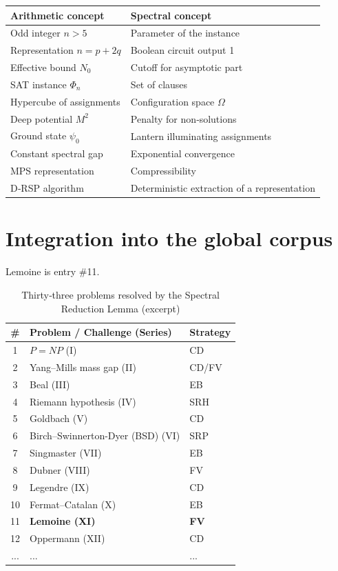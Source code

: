 \documentclass[11pt,a4paper]{article}
\begin{document}
\begin{center}
\small
\begin{tabular}{@{}l|l@{}}
\toprule
\textbf{Arithmetic concept} & \textbf{Spectral concept} \\
\midrule
Odd integer $n > 5$ & Parameter of the instance \\
Representation $n = p + 2q$ & Boolean circuit output 1 \\
Effective bound $N_0$ & Cutoff for asymptotic part \\
SAT instance $\Phi_n$ & Set of clauses \\
Hypercube of assignments & Configuration space $\Omega$ \\
Deep potential $M^2$ & Penalty for non‑solutions \\
Ground state $\psi_0$ & Lantern illuminating assignments \\
Constant spectral gap & Exponential convergence \\
MPS representation & Compressibility \\
D‑RSP algorithm & Deterministic extraction of a representation \\
\bottomrule
\end{tabular}
\end{center}

\section{Integration into the global corpus}

Lemoine is entry \#11.

\begin{center}
\small
\begin{longtable}{@{}cll@{}}
\caption{Thirty‑three problems resolved by the Spectral Reduction Lemma (excerpt)}\\
\toprule
\# & Problem / Challenge (Series) & Strategy \\
\midrule
1 & \(P = NP\) (I) & CD \\
2 & Yang–Mills mass gap (II) & CD/FV \\
3 & Beal (III) & EB \\
4 & Riemann hypothesis (IV) & SRH \\
5 & Goldbach (V) & CD \\
6 & Birch–Swinnerton-Dyer (BSD) (VI) & SRP \\
7 & Singmaster (VII) & EB \\
8 & Dubner (VIII) & FV \\
9 & Legendre (IX) & CD \\
10 & Fermat–Catalan (X) & EB \\
11 & \textbf{Lemoine (XI)} & \textbf{FV} \\
12 & Oppermann (XII) & CD \\
... & ... & ... \\
\bottomrule
\end{longtable}
\end{center}
\end{document}
